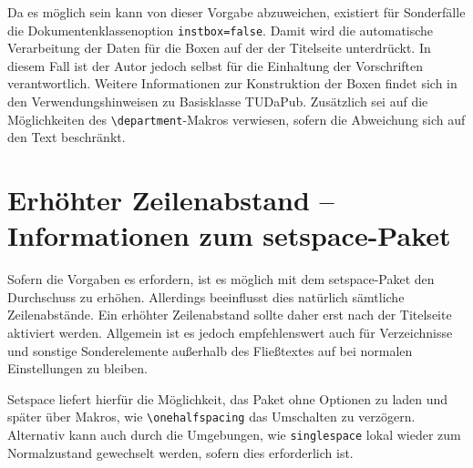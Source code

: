\documentclass[
	ngerman,
	ruledheaders=section,%
	class=report,%
	thesis={type=bachelor},%
	accentcolor=9c,%
	custommargins=true,%
	marginpar=false,%
	parskip=half-,%
	fontsize=11pt,%
]{tudapub}
\let\code\texttt
\let\tbs\textbackslash
\begin{document}
Da es möglich sein kann von dieser Vorgabe abzuweichen, existiert für Sonderfälle die Dokumentenklassenoption \code{instbox=false}. Damit wird die automatische Verarbeitung der Daten für die Boxen auf der der Titelseite unterdrückt. In diesem Fall ist der Autor jedoch selbst für die Einhaltung der Vorschriften verantwortlich. Weitere Informationen zur Konstruktion der Boxen findet sich in den Verwendungshinweisen zu Basisklasse TUDaPub. Zusätzlich sei auf die Möglichkeiten des \code{\textbackslash{}department}-Makros verwiesen, sofern die Abweichung sich auf den Text beschränkt.

\section{Erhöhter Zeilenabstand -- Informationen zum setspace-Paket}
Sofern die Vorgaben es erfordern, ist es möglich mit dem setspace-Paket den Durchschuss zu erhöhen. Allerdings beeinflusst dies natürlich sämtliche Zeilenabstände. Ein erhöhter Zeilenabstand sollte daher erst nach der Titelseite aktiviert werden. Allgemein ist es jedoch empfehlenswert auch für Verzeichnisse und sonstige Sonderelemente außerhalb des Fließtextes auf bei normalen Einstellungen zu bleiben.

Setspace liefert hierfür die Möglichkeit, das Paket ohne Optionen zu laden und später über Makros, wie \code{\tbs{}onehalfspacing} das Umschalten zu verzögern. Alternativ kann auch durch die Umgebungen, wie \code{singlespace} lokal wieder zum Normalzustand gewechselt werden, sofern dies erforderlich ist.

\printbibliography
\end{document}
